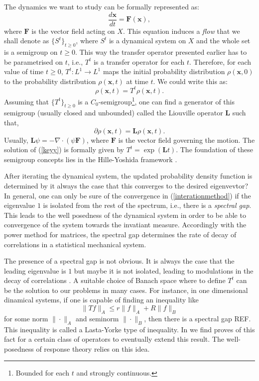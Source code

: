 The dynamics we want to study can be formally represented as:
	\begin{equation}
	\frac{d\mathbf{x}}{dt}=\mathbf{F}(\mathbf{x}),
	\end{equation}
where $\mathbf{F}$ is the vector field acting on $X$. This equation induces a \emph{flow} that we shall denote as $\{S^t\}_{t\geq 0}$, where $S^t$ is a dynamical system on $X$ and the whole set is a semigroup on $t\geq 0.$ This way the transfer operator presented earlier has to be parametrised on $t$, i.e., $T^t$ is a transfer operator for each $t$. Therefore, for each value of time $t\geq 0$, $T^t: L^1 \longrightarrow L^1$ maps the initial probability distribution $\rho(\mathbf{x},0)$ to the probability distribution $\rho(\mathbf{x},t)$ at time $t$. We could write this as:
\begin{equation}\label{keyy}
	\rho (\mathbf{x},t)= T^t\rho(\mathbf{x},t).
\end{equation}
Assuming that $\{T^t\}_{t\geq0}$ is a $C_0$-semigroup\footnote{Bounded for each $t$ and strongly continuous.}, one can find a generator of this semigroup (usually closed and unbounded) called the Liouville operator $\mathbf{L}$ \cite{lucarini} such that,
\begin{equation}\label{putt}
	\partial \rho (\mathbf{x},t)= \mathbf{L}\rho(\mathbf{x},t).
\end{equation}
Usually, $\mathbf{L}\psi=-\nabla \cdot (\psi \mathbf{F})$, where $\mathbf{F}$ is the vector field governing the motion. The solution of (\ref{keyy}) is formally given by $T^t=\exp (\mathbf{L}t)$. The foundation of these semigroup concepts lies in the Hille-Yoshida framework \cite{pazy}.

After iterating the dynamical system, the updated probability density function is determined by  it always the case that this converges to the desired eigenvevtor? In general, one can only be sure of the convergence in (\ref{interationmethod}) if the eigenvalue $1$ is isolated from the rest of the spectrum, i.e., there is a \emph{spectral gap}. This leads to the well posedness of the dynamical system in order to be able to convergence of the system towards the invatiant measure. Accordingly with the power method for matrices, the spectral gap determines the rate of decay of correlations in a statistical mechanical system.

The presence of a spectral gap is not obvious. It is always the case that the leading eigenvalue is $1$ but maybe it is not isolated, leading to modulations in the decay of correlations \cite{chekroun}. A suitable choice of Banach space where to define $T^t$ can be the solution to our problems in many cases. For instance, in one dimensional dinamical systems, if one is capable of finding an inequality like
\begin{equation}\label{lasotayorke}
	\| Tf\|_A \leq r\|f\|_A + R\|f\|_B
\end{equation}
for some norm $\|\cdot\|_A$ and seminorm $\|\cdot \|_B$, then there is a spectral gap REF. This inequality is called a Lasta-Yorke type of inequality. In \cite{liverani} we find proves of this fact for a certain class of operators to eventually extend this result. The well-posedness of response theory relies on this idea.

